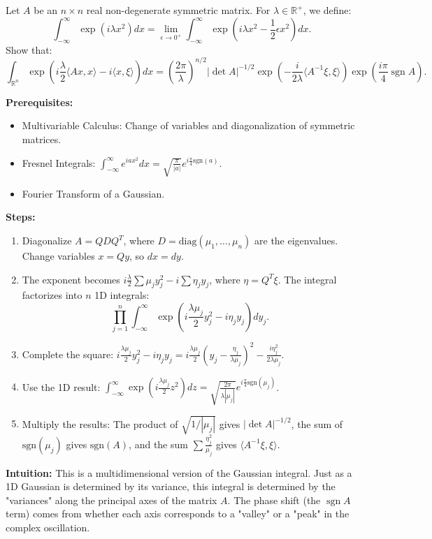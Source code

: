 \begin{exercise}
\label{analysis:2013:6}
Let $A$ be an $n\times n$ real non-degenerate symmetric matrix. For $\lambda\in\mathbb{R}^+$, we define:
\[
\int_{-\infty}^{\infty} \exp\left(i\lambda x^2\right)dx = \lim_{\epsilon\to 0^+}\int_{-\infty}^{\infty} \exp\left(i\lambda x^2 - \frac{1}{2}\epsilon x^2\right)dx.
\]
Show that:
\[
\int_{\mathbb{R}^n} \exp\left(i\frac{\lambda}{2}\langle Ax,x\rangle - i\langle x,\xi\rangle\right)dx = \left(\frac{2\pi}{\lambda}\right)^{n/2}|\det A|^{-1/2}\exp\left(-\frac{i}{2\lambda}\langle A^{-1}\xi,\xi\rangle\right)\exp\left(\frac{i\pi}{4}\operatorname{sgn}A\right).
\]
\end{exercise}

\begin{solution}
\textbf{Prerequisites:}
\begin{itemize}
    \item Multivariable Calculus: Change of variables and diagonalization of symmetric matrices.
    \item Fresnel Integrals: $\int_{-\infty}^\infty e^{iax^2} dx = \sqrt{\frac{\pi}{|a|}} e^{i\frac{\pi}{4}\text{sgn}(a)}$.
    \item Fourier Transform of a Gaussian.
\end{itemize}

\textbf{Steps:}
\begin{enumerate}
    \item Diagonalize $A = Q D Q^T$, where $D = \text{diag}(\mu_1, \dots, \mu_n)$ are the eigenvalues. Change variables $x = Qy$, so $dx = dy$.

    \item The exponent becomes $i\frac{\lambda}{2} \sum \mu_j y_j^2 - i \sum \eta_j y_j$, where $\eta = Q^T \xi$. The integral factorizes into $n$ 1D integrals:
    \[
    \prod_{j=1}^n \int_{-\infty}^\infty \exp\left( i \frac{\lambda \mu_j}{2} y_j^2 - i \eta_j y_j \right) dy_j.
    \]

    \item Complete the square: $i \frac{\lambda \mu_j}{2} y_j^2 - i \eta_j y_j = i \frac{\lambda \mu_j}{2} (y_j - \frac{\eta_j}{\lambda \mu_j})^2 - \frac{i \eta_j^2}{2 \lambda \mu_j}$.

    \item Use the 1D result: $\int_{-\infty}^\infty \exp( i \frac{\lambda \mu_j}{2} z^2 ) dz = \sqrt{\frac{2\pi}{\lambda |\mu_j|}} e^{i \frac{\pi}{4} \text{sgn}(\mu_j)}$.

    \item Multiply the results: The product of $\sqrt{1/|\mu_j|}$ gives $|\det A|^{-1/2}$, the sum of $\text{sgn}(\mu_j)$ gives $\text{sgn}(A)$, and the sum $\sum \frac{\eta_j^2}{\mu_j}$ gives $\langle A^{-1} \xi, \xi \rangle$.
\end{enumerate}

\textbf{Intuition:}
This is a multidimensional version of the Gaussian integral. Just as a 1D Gaussian is determined by its variance, this integral is determined by the "variances" along the principal axes of the matrix $A$. The phase shift (the $\operatorname{sgn}A$ term) comes from whether each axis corresponds to a "valley" or a "peak" in the complex oscillation.
\end{solution}

